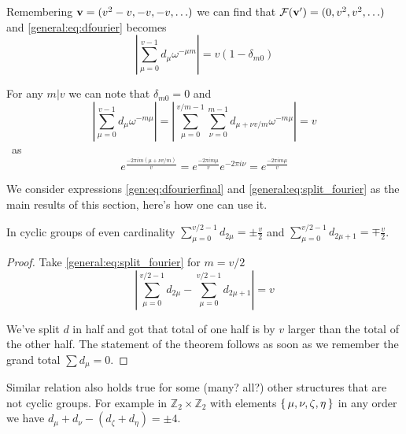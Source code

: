         Remembering ${\bf v} = (v^2-v, -v, -v, \ldots)$ we can find that $\mathcal{F}({\bf v'}) = (0,v^2,v^2,\ldots)$ and \eqref{general:eq:dfourier} becomes
        \begin{equation}
            \label{gen:eq:dfourierfinal}
            \left| \sum_{\mu=0}^{v-1} d_\mu \omega^{-\mu m} \right| = v (1-\delta_{m0})
        \end{equation}

        For any $m | v$ we can note that $\delta_{m0}=0$ and
        \begin{equation}
            \label{general:eq:split_fourier}
            \left| \sum_{\mu=0}^{v-1} d_\mu \omega^{-m\mu} \right|
            = \left| \sum_{\mu=0}^{v/m-1} \sum_{\nu=0}^{m-1}  d_{\mu+\nu v/m} \omega^{-m\mu} \right|
            =v
        \end{equation}\
        as 
        \begin{equation}
            e^{\frac{-2\pi i m (\mu+\nu v/m)}v} = e^{\frac{-2\pi i m \mu}v} e^{-2\pi i \nu} = e^{\frac{-2\pi i m \mu}v}
        \end{equation}
        
        We consider expressions \eqref{gen:eq:dfourierfinal} and \eqref{general:eq:split_fourier} as the main results of this section, here's how one can use it.
        
        \begin{proposition}
            \label{general:theorem:even_cyclic}
            In cyclic groups of even cardinality $\sum_{\mu=0}^{v/2-1} d_{2\mu} = \pm \frac v2$ and $\sum_{\mu=0}^{v/2-1} d_{2\mu+1} = \mp \frac v2$.
        \end{proposition}
        \begin{proof}
            Take \eqref{general:eq:split_fourier} for $m=v/2$
            \begin{equation}
                \left| \sum_{\mu=0}^{v/2-1} d_{2\mu} - \sum_{\mu=0}^{v/2-1} d_{2\mu+1} \right| = v
            \end{equation}
            
            We've split $d$ in half and got that total of one half is by $v$ larger than the total of the other half. The statement of the theorem follows as soon as we remember the grand total $\sum d_\mu = 0$.
        \end{proof}
        
        \begin{remark}
            Similar relation also holds true for some (many? all?) other structures that are not cyclic groups. For example in $\mathbb Z_2 \times \mathbb Z_2$ with elements $\set{\mu, \nu, \zeta, \eta}$ in any order we have $d_\mu+d_\nu-(d_\zeta+d_\eta)=\pm 4$.
        \end{remark}


